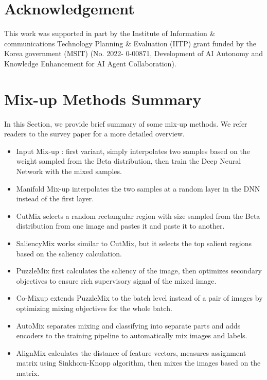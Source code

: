 \documentclass[letterpaper]{article} \usepackage[submission]{aaai23}  \usepackage{times}  \usepackage{helvet}  \usepackage{courier}  \usepackage[hyphens]{url}  \usepackage{graphicx} \urlstyle{rm} \def\UrlFont{\rm}  \usepackage{natbib}  \usepackage{caption} \frenchspacing  \setlength{\pdfpagewidth}{8.5in} \setlength{\pdfpageheight}{11in}
\begin{document}
\section*{Acknowledgement}
This work was supported in part by the Institute of Information \& communications Technology Planning \& Evaluation (IITP) grant funded by the Korea government (MSIT) (No. 2022- 0-00871, Development of AI Autonomy and Knowledge Enhancement for AI Agent Collaboration).



\clearpage


\section*{Mix-up Methods Summary}
In this Section, we provide brief summary of some mix-up methods. We refer readers to the survey paper \cite{naveed2021survey} for a more detailed overview.

\begin{itemize}
    \item Input Mix-up \cite{zhang2018mixup}: first variant, simply interpolates two samples based on the weight sampled from the Beta distribution, then train the Deep Neural Network with the mixed samples.
    \item Manifold Mix-up \cite{verma2019manifold} interpolates the two samples at a random layer in the DNN instead of the first layer.
    \item CutMix \cite{yun2019cutmix} selects a random rectangular region with size sampled from the Beta distribution from one image and pastes it and paste it to another.
    \item SaliencyMix \cite{uddin2021saliencymix} works similar to CutMix, but it selects the top salient regions based on the saliency calculation.
    \item PuzzleMix \cite{kim2020puzzlemix} first calculates the saliency of the image, then optimizes secondary objectives to ensure rich supervisory signal of the mixed image.
    \item Co-Mixup \cite{kim2021comixup} extends PuzzleMix to the batch level instead of a pair of images by optimizing mixing objectives for the whole batch. 
    \item AutoMix \cite{mixup10} separates mixing and classifying into separate parts and adds encoders to the training pipeline to automatically mix images and labels.
    \item AlignMix \cite{mixup9} calculates the distance of feature vectors, measures assignment matrix using Sinkhorn-Knopp algorithm, then mixes the images based on the matrix.
\end{itemize}
\end{document}
